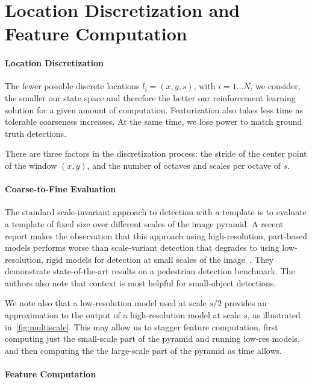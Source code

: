 \section{Location Discretization and Feature Computation} \label{sec:discretization_and_featurization}

\paragraph{Location Discretization}
The fewer possible discrete locations $l_i = (x,y,s)$, with $i = 1 \dots N$, we consider, the smaller our state space and therefore the better our reinforcement learning solution for a given amount of computation.
Featurization also takes less time as tolerable coarseness increases.
At the same time, we lose power to match ground truth detections.

There are three factors in the discretization process: the stride of the center point of the window $(x,y)$, and the number of octaves and scales per octave of $s$.


\paragraph{Coarse-to-Fine Evaluation}
The standard scale-invariant approach to detection with a template is to evaluate a template of fixed size over different scales of the image pyramid.
A recent report makes the observation that this approach using high-resolution, part-based models performs worse than scale-variant detection that degrades to using low-resolution, rigid models for detection at small scales of the image~\cite{Park2010}.
They demonstrate state-of-the-art results on a pedestrian detection benchmark.
The authors also note that context is most helpful for small-object detections.


We note also that a low-resolution model used at scale $s/2$ provides an approximation to the output of a high-resolution model at scale $s$, as illustrated in~\autoref{fig:multiscale}.
This may allow us to stagger feature computation, first computing just the small-scale part of the pyramid and running low-res models, and then computing the the large-scale part of the pyramid as time allows.

\paragraph{Feature Computation}

